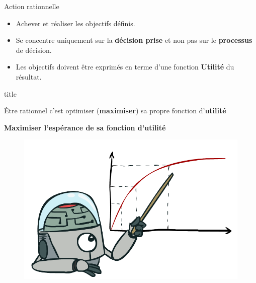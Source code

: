 \documentclass{beamer}
\begin{document}
\begin{frame}[<+->]{Action rationnelle}
  \begin{itemize}
    \item Achever et réaliser les objectifs définis.
    \item Se concentre uniquement sur la \alert{\textbf{décision prise}} et non pas sur le
      \textbf{processus} de décision.
    \item Les objectifs doivent être exprimés en terme d'une fonction
      \textbf{\alert{Utilité}} du résultat.
\end{itemize}

\begin{block}{title}
  
  Être rationnel c'est  optimiser (\textbf{maximiser}) sa propre fonction
  d'\textbf{utilité}
\end{block}
\end{frame}

\begin{frame}[t]

  \huge{\textbf{Maximiser l'espérance de sa fonction d'utilité}}
  \begin{figure}[htpb]
    \centering
    \includegraphics[width=0.8\linewidth]{./images/maximize_expected_utility.png}
  \end{figure}
\end{frame}

\end{document}
